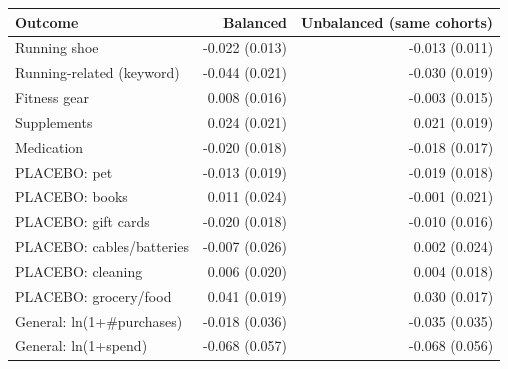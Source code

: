 \begin{tabular}{lrr}
\toprule
Outcome & Balanced & Unbalanced (same cohorts) \\
\midrule
Running shoe & -0.022 (0.013) & -0.013 (0.011) \\
Running-related (keyword) & -0.044 (0.021) & -0.030 (0.019) \\
Fitness gear & 0.008 (0.016) & -0.003 (0.015) \\
Supplements & 0.024 (0.021) & 0.021 (0.019) \\
Medication & -0.020 (0.018) & -0.018 (0.017) \\
PLACEBO: pet & -0.013 (0.019) & -0.019 (0.018) \\
PLACEBO: books & 0.011 (0.024) & -0.001 (0.021) \\
PLACEBO: gift cards & -0.020 (0.018) & -0.010 (0.016) \\
PLACEBO: cables/batteries & -0.007 (0.026) & 0.002 (0.024) \\
PLACEBO: cleaning & 0.006 (0.020) & 0.004 (0.018) \\
PLACEBO: grocery/food & 0.041 (0.019) & 0.030 (0.017) \\
General: ln(1+\#purchases) & -0.018 (0.036) & -0.035 (0.035) \\
General: ln(1+spend) & -0.068 (0.057) & -0.068 (0.056) \\
\bottomrule
\end{tabular}
